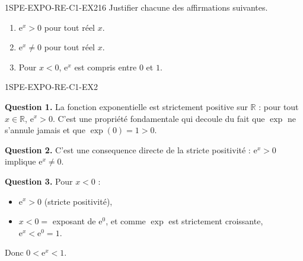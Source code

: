 
\begin{exercice}{1SPE-EXPO-RE-C1-EX2}{1}{6}
Justifier chacune des affirmations suivantes.
\begin{enumerate}
  \item $\mathrm{e}^x > 0$ pour tout réel $x$.
  \item $\mathrm{e}^x
\neq 0$ pour tout réel $x$.
  \item Pour $x < 0$, $\mathrm{e}^x$ est compris entre $0$ et $1$.
\end{enumerate}
\end{exercice}



\begin{corrige}{1SPE-EXPO-RE-C1-EX2}

\textbf{Question 1.} La fonction exponentielle est strictement positive sur $\mathbb{R}$ : pour tout $x \in \mathbb{R}$, $\mathrm{e}^x > 0$. C'est une propriété fondamentale qui decoule du fait que $\exp$ ne s'annule jamais et que $\exp(0) = 1 > 0$.

\textbf{Question 2.} C'est une consequence directe de la stricte positivité : $\mathrm{e}^x > 0$ implique $\mathrm{e}^x
\neq 0$.


\textbf{Question 3.} Pour $x < 0$ :
\begin{itemize}
  \item $\mathrm{e}^x > 0$ (stricte positivité),
  \item $x < 0 = $ exposant de $\mathrm{e}^0$, et comme $\exp$ est strictement croissante, $\mathrm{e}^x < \mathrm{e}^0 = 1$.
\end{itemize}
Donc $0 < \mathrm{e}^x < 1$.

\end{corrige}

